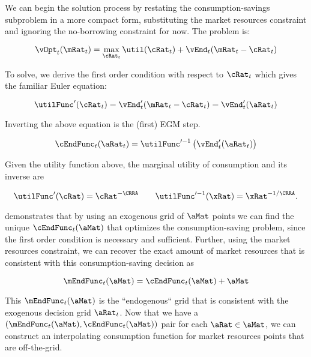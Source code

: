 \documentclass[\econtexRoot/SequentialEGM]{subfiles}
\begin{document}
We can begin the solution process by restating the consumption-savings subproblem in a more compact form, substituting the market resources constraint and ignoring the no-borrowing constraint for now. The problem is:

\begin{equation}
        \vOpt_{t}(\mRat_{t}) = \max_{\cRat_{t}} \util(\cRat_{t}) +
        \vEnd_{t}(\mRat_{t}-\cRat_{t})
\end{equation}

To solve, we derive the first order condition with respect to $\cRat_{t}$ which gives the familiar Euler equation:

\begin{equation}
        \utilFunc'(\cRat_t) = \vEnd_{t}'(\mRat_{t} - \cRat_{t}) =
        \vEnd_{t}'(\aRat_{t})
\end{equation}

Inverting the above equation is the (first) EGM step.

\begin{equation}
        \cEndFunc_{t}(\aRat_{t}) = \utilFunc'^{-1}\left( \vEnd_{t}'(\aRat_{t})
        \right)
\end{equation}

Given the utility function above, the marginal utility of consumption and its inverse are

\begin{equation}
        \utilFunc'(\cRat) = \cRat^{-\CRRA} \qquad \utilFunc'^{-1}(\xRat) =
        \xRat^{-1/\CRRA}.
\end{equation}

\cite{Carroll2006-wq} demonstrates that by using an exogenous grid of $\aMat$ points we can find the unique
$\cEndFunc_{t}(\aMat)$ that optimizes the consumption-saving problem, since the first order condition is necessary and sufficient.
Further, using the market resources constraint, we can recover the exact amount
of market resources that is consistent with this consumption-saving decision as

\begin{equation}
        \mEndFunc_{t}(\aMat) = \cEndFunc_{t}(\aMat) + \aMat
\end{equation}

This $\mEndFunc_{t}(\aMat)$ is the ``endogenous`` grid that is consistent
with the exogenous decision grid $\aRat_{t}$. Now that we have a
$(\mEndFunc_{t}(\aMat), \cEndFunc_{t}(\aMat))$ pair for each
$\aRat \in \aMat$, we can construct an interpolating consumption function for
market resources points that are off-the-grid.
\end{document}
